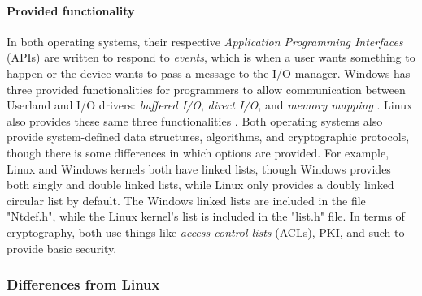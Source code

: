 \documentclass[letterpaper,10pt,titlepage]{article}
\begin{document}
\paragraph{Provided functionality}
In both operating systems, their respective \emph{Application Programming Interfaces} (APIs) are written to respond to \emph{events}, which is when a user wants something to happen or the device wants to pass a message to the I/O manager. Windows has three provided functionalities for programmers to allow communication between Userland and I/O drivers: \emph{buffered I/O}, \emph{direct I/O}, and \emph{memory mapping} \cite{windows3}. Linux also provides these same three functionalities \cite{linux}. Both operating systems also provide system-defined data structures, algorithms, and cryptographic protocols, though there is some differences in which options are provided. For example, Linux and Windows kernels both have linked lists, though Windows provides both singly and double linked lists, while Linux only provides a doubly linked circular list by default. The Windows linked lists are included in the file "Ntdef.h", while the Linux kernel's list is included in the "list.h" file. In terms of cryptography, both use things like \emph{access control lists} (ACLs), PKI, and such to provide basic security. 

% 
%
%

\subsubsection{Differences from Linux}
\end{document}
